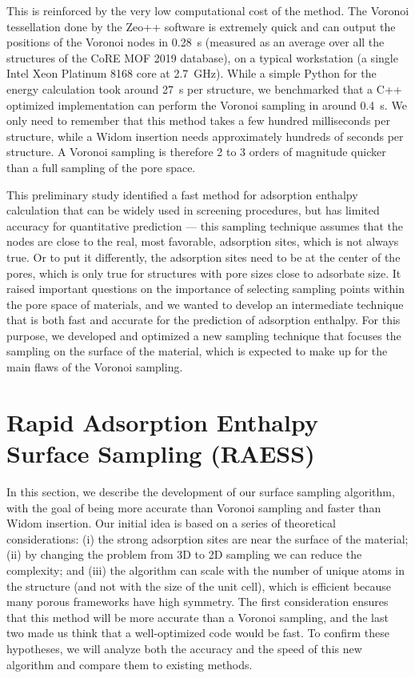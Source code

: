 \documentclass[main]{subfiles}
\begin{document}
This is reinforced by the very low computational cost of the method. The Voronoi tessellation done by the Zeo++ software is extremely quick and can output the positions of the Voronoi nodes in \SI{0.28}{\second} (measured as an average over all the structures of the CoRE MOF 2019 database), on a typical workstation (a single Intel Xeon Platinum 8168 core at 2.7~\si{\giga\hertz}). While a simple Python for the energy calculation took around \SI{27}{\second} per structure, we benchmarked that a C++ optimized implementation can perform the Voronoi sampling in around \SI{0.4}{\second}. We only need to remember that this method takes a few hundred milliseconds per structure, while a Widom insertion needs approximately hundreds of seconds per structure. A Voronoi sampling is therefore 2 to 3 orders of magnitude quicker than a full sampling of the pore space.

This preliminary study identified a fast method for adsorption enthalpy calculation that can be widely used in screening procedures, but has limited accuracy for quantitative prediction --- this sampling technique assumes that the nodes are close to the real, most favorable, adsorption sites, which is not always true. Or to put it differently, the adsorption sites need to be at the center of the pores, which is only true for structures with pore sizes close to adsorbate size. It raised important questions on the importance of selecting sampling points within the pore space of materials, and we wanted to develop an intermediate technique that is both fast and accurate for the prediction of adsorption enthalpy. For this purpose, we developed and optimized a new sampling technique that focuses the sampling on the surface of the material, which is expected to make up for the main flaws of the Voronoi sampling.

\section{Rapid Adsorption Enthalpy Surface Sampling (RAESS)}

In this section, we describe the development of our surface sampling algorithm, with the goal of being more accurate than Voronoi sampling and faster than Widom insertion. Our initial idea is based on a series of theoretical considerations: (i) the strong adsorption sites are near the surface of the material; (ii) by changing the problem from 3D to 2D sampling we can reduce the complexity; and (iii) the algorithm can scale with the number of unique atoms in the structure (and not with the size of the unit cell), which is efficient because many porous frameworks have high symmetry. The first consideration ensures that this method will be more accurate than a Voronoi sampling, and the last two made us think that a well-optimized code would be fast. To confirm these hypotheses, we will analyze both the accuracy and the speed of this new algorithm and compare them to existing methods.
\end{document}
